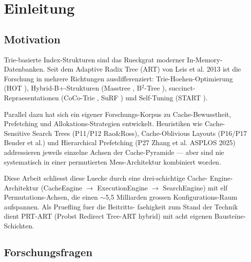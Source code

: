 \chapter{Einleitung}\label{ch:einleitung}


\section{Motivation}

Trie-basierte Index-Strukturen sind das Rueckgrat moderner In-Memory-
Datenbanken. Seit dem Adaptive Radix Tree (ART) von Leis et al.
\cite{leis2013art} 2013 ist die Forschung in mehrere Richtungen
ausdifferenziert: Trie-Hoehen-Optimierung (HOT \cite{binna2018hot}),
Hybrid-B+-Strukturen (Masstree \cite{mao2012masstree}, B$^2$-Tree
\cite{schmeisser2022b2tree}), succinct-Repraesentationen (CoCo-Trie
\cite{boffa2024coco}, SuRF \cite{zhang2018surf}) und Self-Tuning
(START \cite{fent2020start}).

Parallel dazu hat sich ein eigener Forschungs-Korpus zu
Cache-Bewusstheit, Prefetching und Allokations-Strategien entwickelt.
Heuristiken wie Cache-Sensitive Search Trees (P11/P12 Rao\&Ross),
Cache-Oblivious Layouts (P16/P17 Bender et al.) und Hierarchical
Prefetching (P27 Zhang et al. ASPLOS 2025) addressieren jeweils
einzelne Achsen der Cache-Pyramide --- aber sind nie systematisch
in einer permutierten Mess-Architektur kombiniert worden.

Diese Arbeit schliesst diese Luecke durch eine drei-schichtige Cache-
Engine-Architektur (CacheEngine $\to$ ExecutionEngine $\to$ SearchEngine)
mit elf Permutations-Achsen, die einen $\sim$5,5 Milliarden grossen
Konfigurations-Raum aufspannen. Als Pruefling fuer die Beitritts-
faehigkeit zum Stand der Technik dient PRT-ART (Probst Redirect
Tree-ART hybrid) mit acht eigenen Bausteine-Schichten.

\section{Forschungsfragen}


